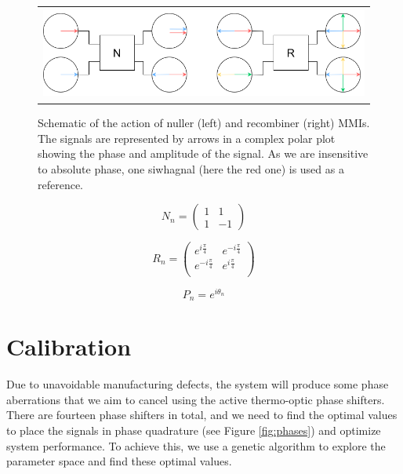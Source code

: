\documentclass[]{spie}  %
\begin{document}
\begin{figure} [H]
    \begin{center}
    \begin{tabular}{c}
    \includegraphics[height=3cm]{img/nuller_and_recombiner.png}
    \end{tabular}
    \end{center}
    \caption[nuller_and_recombiner] 
    { \label{fig:nuller_and_recombiner} 
    Schematic of the action of nuller (left) and recombiner (right) MMIs. The signals are represented by arrows in a complex polar plot showing the phase and amplitude of the signal. As we are insensitive to absolute phase, one siwhagnal (here the red one) is used as a reference.}
\end{figure}

\begin{equation}\label{N}
    N_n =
    \begin{pmatrix}
        1 & 1 \\
        1 & -1
    \end{pmatrix}
\end{equation}

\begin{equation}\label{R}
    R_n =
    \begin{pmatrix}
        e^{i\frac{\pi}{4}} & e^{-i\frac{\pi}{4}} \\
        e^{-i\frac{\pi}{4}} & e^{i\frac{\pi}{4}} \\
    \end{pmatrix}
\end{equation}

\begin{equation}\label{P}
    P_n = e^{i\theta_n}
\end{equation}

\section{Calibration}

Due to unavoidable manufacturing defects, the system will produce some phase aberrations that we aim to cancel using the active thermo-optic phase shifters. There are fourteen phase shifters in total, and we need to find the optimal values to place the signals in phase quadrature (see Figure \ref{fig:phases}) and optimize system performance. To achieve this, we use a genetic algorithm to explore the parameter space and find these optimal values.
\end{document}
